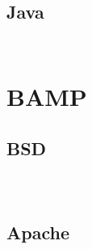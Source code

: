 \begin{lstlisting}[language=bash]

\end{lstlisting}




\begin{lstlisting}[language=bash]

\end{lstlisting}


\section{Java}



\begin{lstlisting}[language=bash]

\end{lstlisting}




\begin{lstlisting}[language=bash]

\end{lstlisting}


\chapter{BAMP}



\section{BSD}


\begin{lstlisting}[language=bash]

\end{lstlisting}





\begin{lstlisting}[language=bash]

\end{lstlisting}



\begin{lstlisting}[language=bash]

\end{lstlisting}



\section{Apache}




